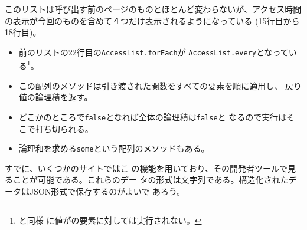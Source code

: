 このリストは呼び出す前のページのものとほとんど変わらないが、アクセス時間
の表示が今回のものを含めて４つだけ表示されるようになっている
(15行目から18行目)。
\begin{itemize}
 \item 前のリストの22行目の\Verb+AccessList.forEach+が
			 \Verb+AccessList.every+となっている\footnote{と同様
			 に値がの要素に対しては実行されない。}。
 \item この配列のメソッドは引き渡された関数をすべての要素を順に適用し、
			 戻り値の論理積を返す。
 \item どこかのところで\Verb+false+となれば全体の論理積は\Verb+false+と
			 なるので実行はそこで打ち切られる。
 \item 論理和を求める\Verb+some+という配列のメソッドもある。
\end{itemize}

すでに、いくつかのサイトではこ
の機能を用いており、その開発者ツールで見ることが可能である。これらのデー
タの形式は文字列である。構造化されたデータはJSON形式で保存するのがよいで
あろう。

\else
\fi